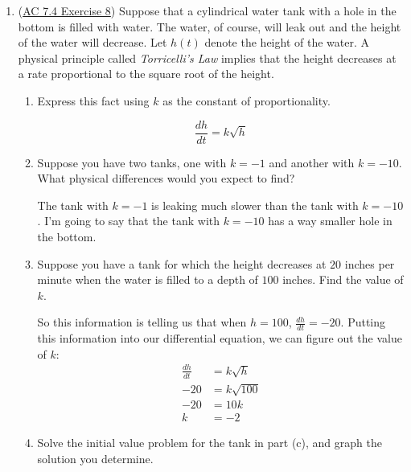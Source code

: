 \documentclass[10pt]{article}
\newenvironment{red}{\color{red}}{\ignorespacesafterend}
\begin{document}
\begin{enumerate}[leftmargin=0pt]
\begin{enumerate}
    \begin{red}
    Yeah, so that slope is wild: $\frac{dy}{dt} = -\frac{t}{y} = -\frac{8}{0}$. (Indeed, the tangent line to the side of the circle is vertical and thus has an undefined slope.)
    \end{red}
\end{enumerate}

\item (\href{https://activecalculus.org/single/sec-7-4-separable.html#FxE}{AC 7.4 Exercise 8}) Suppose that a cylindrical water tank with a hole in the bottom is filled with water. The water, of course, will leak out and the height of the water will decrease. Let $h(t)$ denote the height of the water. A physical principle called \textit{Torricelli's Law} implies that the height decreases at a rate proportional to the square root of the height.
\begin{enumerate}
    \item Express this fact using $k$ as the constant of proportionality.
    
    \begin{red}
    \[\frac{dh}{dt} = k\sqrt{h}\]
    \end{red}
    \item Suppose you have two tanks, one with $k = -1$ and another with $k=-10$. What physical differences would you expect to find?
    
    \begin{red}
    The tank with $k=-1$ is leaking much slower than the tank with $k=-10$. I'm going to say that the tank with $k=-10$ has a way smaller hole in the bottom.
    \end{red}
    \item Suppose you have a tank for which the height decreases at $20$ inches per minute when the water is filled to a depth of $100$ inches. Find the value of $k$.
    
    \begin{red}
    So this information is telling us that when $h = 100$, $\frac{dh}{dt} = -20$. Putting this information into our differential equation, we can figure out the value of $k$:
    \begin{align*}
        \frac{dh}{dt} &= k\sqrt{h} \\
        -20 &= k\sqrt{100} \\
        -20 &= 10k \\
        k &= -2
    \end{align*}
    \end{red}
    \item Solve the initial value problem for the tank in part (c), and graph the solution you determine.
    

\end{enumerate}
\end{enumerate}
\end{document}
